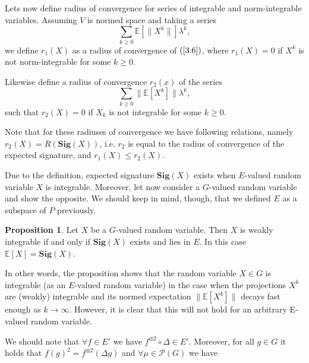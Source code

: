 \documentclass[12pt,a4paper]{report}
\theoremstyle{definition}
\newtheorem{proposition}{Proposition}
\begin{document}

Lets now define radius of convergence for series of integrable and norm-integrable variables. Assuming $V$ is normed space and taking a series 
\begin{equation}\label{3.6}
	\sum_{k\geq0}\mathbb{E}[\lVert X^k\rVert]\lambda^k,
\end{equation}
we define $r_1(X)$ as a radius of convergence of $(\ref{3.6})$, where $r_1(X)=0$ if $X^k$ is not norm-integrable for some $k \geq 0$.

Likewise define a radius of convergence $r_2(x)$ of the series 
\begin{equation}\label{3.7}
	\sum_{k\geq0}\lVert\mathbb{E}[ X^k]\rVert\lambda^k,
\end{equation}
such that $r_2(X)=0$ if $X_k$ is not integrable for some $k \geq 0$.

Note that for these radiuses of convergence we have following relations, namely $r_2(X) = R(\textbf{Sig}(X))$, i.e. $r_2$ is equal to the radius of convergence of the expected signature, and $r_1(X) \leq r_2(X)$. 

Due to the definition, expected signature $\textbf{Sig}(X)$ exists when $E$-valued random variable $X$ is integrable. Moreover, let now consider a $G$-valued random variable and show the opposite. 
We should keep in mind, though, that we defined $E$ as a subspace of $P$ previously.

\begin{proposition} \label{prop3.2}
	Let $X$ be a $G$-valued random variable. Then $X$ is weakly integrable if and only if $\textbf{Sig}(X)$ exists and lies in $E$. In this case $\mathbb{E}[X] = \textbf{Sig}(X)$.
\end{proposition} 

In other words, the proposition shows that the random variable $X \in G$ is integrable (as an $E$-valued random variable) in the case when the projections $X^k$ are (weakly) integrable and its normed expectation $\lVert\mathbb{E}[X^k]\rVert$ decays fast enough as $k\rightarrow\infty$. However, it is clear that this will not hold for an arbitrary E-valued random variable.

We should note that $\forall f \in E'$ we have $f^{\otimes 2}\circ\Delta \in E'$. Moreover, for all $g\in G$ it holds that $f(g)^2=f^{\otimes 2}(\Delta g)$ and $\forall \mu \in \mathcal{P}(G)$ we have
\end{document}
